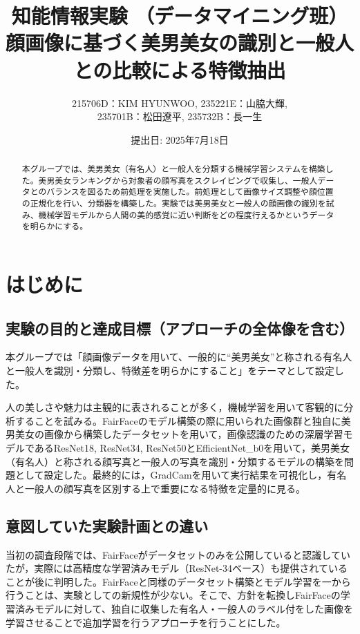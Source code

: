 \documentclass[a4paper,11pt,titlepage]{jsarticle}
\begin{document}
\title{知能情報実験 （データマイニング班）\\顔画像に基づく美男美女の識別と一般人との比較による特徴抽出}
\author{215706D：KIM HYUNWOO, 235221E：山脇大輝,\\ 235701B：松田遼平, 235732B：長一生}
\date{提出日: 2025年7月18日}
\maketitle

\tableofcontents
\clearpage

\begin{abstract}
本グループでは、美男美女（有名人）と一般人を分類する機械学習システムを構築した。美男美女ランキングから対象者の顔写真をスクレイピングで収集し、一般人データとのバランスを図るため前処理を実施した。前処理として画像サイズ調整や顔位置の正規化を行い、分類器を構築した。実験では美男美女と一般人の顔画像の識別を試み、機械学習モデルから人間の美的感覚に近い判断をどの程度行えるかというデータを明らかにする。
\end{abstract} 


\section{はじめに}
\subsection{実験の目的と達成目標（アプローチの全体像を含む）}
本グループでは「顔画像データを用いて、一般的に“美男美女”と称される有名人と一般人を識別・分類し、特徴差を明らかにすること」をテーマとして設定した。

人の美しさや魅力は主観的に表されることが多く，機械学習を用いて客観的に分析することを試みる。FairFaceのモデル構築の際に用いられた画像群と独自に美男美女の画像から構築したデータセットを用いて，画像認識のための深層学習モデルであるResNet18, ResNet34, ResNet50とEfficientNet\_b0を用いて，美男美女（有名人）と称される顔写真と一般人の写真を識別・分類するモデルの構築を問題として設定した。最終的には，GradCamを用いて実行結果を可視化し，有名人と一般人の顔写真を区別する上で重要になる特徴を定量的に見る。

\subsection{意図していた実験計画との違い}
当初の調査段階では、FairFaceがデータセットのみを公開していると認識していたが，実際には高精度な学習済みモデル（ResNet-34ベース）も提供されていることが後に判明した。FairFaceと同様のデータセット構築とモデル学習を一から行うことは、実験としての新規性が少ない。そこで、方針を転換しFairFaceの学習済みモデルに対して、独自に収集した有名人・一般人のラベル付をした画像を学習させることで追加学習を行うアプローチを行うことにした。
\end{document}
